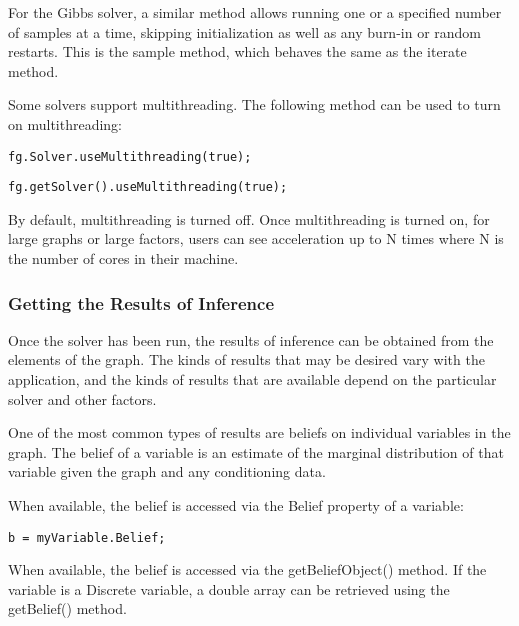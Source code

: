 \fi

For the Gibbs solver, a similar method allows running one or a specified number of samples at a time, skipping initialization as well as any burn-in or random restarts.  This is the sample method, which behaves the same as the iterate method.


Some solvers support multithreading.  The following method can be used to turn on multithreading:

\ifmatlab
\begin{lstlisting}
fg.Solver.useMultithreading(true);
\end{lstlisting}
\fi

\ifjava
\begin{lstlisting}
fg.getSolver().useMultithreading(true);
\end{lstlisting}
\fi

By default, multithreading is turned off.  Once multithreading is turned on, for large graphs or large factors, users can see acceleration up to N times where N is the number of cores in their machine.


\subsubsection{Getting the Results of Inference}

Once the solver has been run, the results of inference can be obtained from the elements of the graph.  The kinds of results that may be desired vary with the application, and the kinds of results that are available depend on the particular solver and other factors.

One of the most common types of results are beliefs on individual variables in the graph.  The belief of a variable is an estimate of the marginal distribution of that variable given the graph and any conditioning data.  

\ifmatlab

When available, the belief is accessed via the Belief property of a variable:

\begin{lstlisting}
b = myVariable.Belief;
\end{lstlisting}
\fi

\ifjava

When available, the belief is accessed via the getBeliefObject() method.  If the variable is a Discrete variable, a double array can be retrieved using the getBelief() method.

